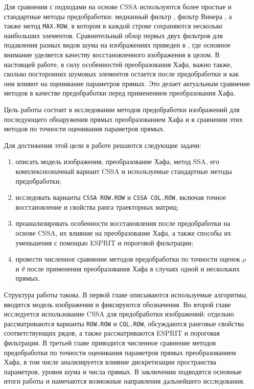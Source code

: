 Для сравнения с подходами на основе CSSA используются более простые и стандартные методы
предобработки: медианный фильтр \cite{huang1979}, фильтр Винера
\cite{wiener1949,lim1990}, а также метод \texttt{MAX.ROW}, в котором в каждой
строке сохраняются несколько наибольших элементов. Сравнительный обзор первых двух фильтров
для подавления разных видов шума на изображениях приведен в
\cite{mafi2019}, где основное внимание уделяется качеству
восстановленного изображения в целом. В настоящей работе, в силу особенностей
преобразования Хафа, важно также, сколько посторонних шумовых элементов
остается после предобработки и как они влияют на оценивание параметров прямых.
Это делает актуальным сравнение методов в качестве предобработки перед применением преобразования Хафа.

Цель работы состоит в исследовании методов предобработки изображений
для последующего обнаружения прямых преобразованием Хафа и в сравнении этих
методов по точности оценивания параметров прямых.

Для достижения этой цели в работе решаются следующие задачи:
\begin{enumerate}
	\setlength{\itemsep}{0pt}
	\setlength{\parsep}{0pt}
	\setlength{\topsep}{0pt}
	\item описать модель изображения, преобразование Хафа, метод SSA, его
	комплекснозначный вариант CSSA и используемые стандартные методы
	предобработки;
	\item исследовать варианты \texttt{CSSA ROW.ROW} и \texttt{CSSA COL.ROW},
	включая точное восстановление и свойства ранга
	траекторных матриц;
	\item проанализировать особенности восстановления после предобработки на основе CSSA,
	их влияние на преобразование Хафа, а также способы их уменьшения с помощью
	ESPRIT и пороговой фильтрации;
	\item провести численное сравнение методов предобработки по точности оценок
	$\rho$ и $\theta$ после применения преобразования Хафа в случаях одной и
	нескольких прямых.
\end{enumerate}

Структура работы такова. В первой главе описываются используемые алгоритмы,
вводится модель изображения и фиксируются обозначения. Во второй главе
исследуется использование CSSA для предобработки изображений: отдельно
рассматриваются варианты \texttt{ROW.ROW} и \texttt{COL.ROW}, обсуждаются
ранговые свойства соответствующих рядов, а также рассматриваются ESPRIT и
пороговая фильтрация. В третьей главе приводится численное сравнение методов
предобработки по точности оценивания параметров прямых преобразованием Хафа, в
том числе анализируется влияние дискретизации пространства параметров,
уровня шума и числа прямых. В заключении подводятся основные итоги работы и
намечаются возможные направления дальнейшего исследования.
